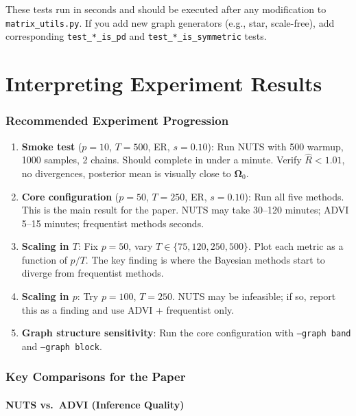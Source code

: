 \documentclass[11pt,a4paper]{article}
\newcommand{\bOmega}{\bm{\Omega}}
\begin{document}
\begin{tipbox}
These tests run in seconds and should be executed after any modification to \texttt{matrix\_utils.py}.  If you add new graph generators (e.g., star, scale-free), add corresponding \texttt{test\_*\_is\_pd} and \texttt{test\_*\_is\_symmetric} tests.
\end{tipbox}


\part{Interpreting Experiment Results}

\section{Recommended Experiment Progression}

\begin{enumerate}
  \item \textbf{Smoke test} ($p=10$, $T=500$, ER, $s=0.10$): Run NUTS with 500 warmup, 1000 samples, 2 chains. Should complete in under a minute. Verify $\hat{R} < 1.01$, no divergences, posterior mean is visually close to $\bOmega_0$.
  \item \textbf{Core configuration} ($p=50$, $T=250$, ER, $s=0.10$): Run all five methods. This is the main result for the paper. NUTS may take 30--120 minutes; ADVI 5--15 minutes; frequentist methods seconds.
  \item \textbf{Scaling in $T$}: Fix $p=50$, vary $T \in \{75, 120, 250, 500\}$. Plot each metric as a function of $p/T$. The key finding is where the Bayesian methods start to diverge from frequentist methods.
  \item \textbf{Scaling in $p$}: Try $p=100$, $T=250$. NUTS may be infeasible; if so, report this as a finding and use ADVI + frequentist only.
  \item \textbf{Graph structure sensitivity}: Run the core configuration with \texttt{--graph band} and \texttt{--graph block}.
\end{enumerate}

\section{Key Comparisons for the Paper}

\subsection{NUTS vs.\ ADVI (Inference Quality)}
\end{document}
